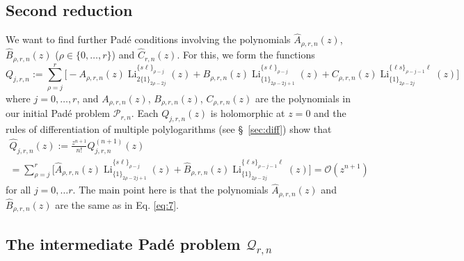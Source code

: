 \documentclass[reqno,12pt]{amsart}
\numberwithin{equation}{section}
\theoremstyle{remark}
\def\li{\operatorname{Li}}
\begin{document}
\subsection{Second reduction} \label{subsecsecondred}



We want to find further Pad\'e conditions involving the polynomials $\widehat{A}_{\rho,r,n}(z)$,  
$\widehat{B}_{\rho,r,n}(z)$ ($\rho \in\{0, \ldots, r\}$) and $\widehat{C}_{r,n}(z)$. For this, we form the functions
$$
Q_{j,r,n}:=\sum_{\rho=j}^r \bigg[-A_{\rho,r,n}(z) \li_{2\{1\}_{2\rho-2j}}^{\{s\ell\}_{\rho-j}}(z) 
+ B_{\rho,r,n}(z) \li_{\{1\}_{2\rho-2j+1}}^{\{s\ell\}_{\rho-j}}(z) + 
C_{\rho,r,n}(z) \li_{\{1\}_{2\rho-2j}}^{\{\ell s\}_{\rho-j-1}\ell}(z)\bigg]
$$
where $j=0, \ldots, r$, and  $A_{\rho,r,n}(z)$, $B_{\rho,r,n}(z)$, $C_{\rho,r,n}(z)$ are 
the polynomials in our initial Pad\'e problem $\mathcal{P}_{r,n}$. Each 
$Q_{j,r,n}(z)$ is holomorphic at $z=0$ and the rules of differentiation of multiple 
 polylogarithms (see \S~\ref{sec:diff})  
 show that
\begin{multline*}
\widehat{Q}_{j,r,n}(z):=\frac{z^{n+1}}{n!}Q_{j,r,n}^{(n+1)}(z)
\\
=\sum_{\rho=j}^r \bigg[\widehat{A}_{\rho,r,n}(z) \li_{\{1\}_{2\rho-2j+1}}^{\{s\ell\}_{\rho-j}}(z) 
+ \widehat{B}_{\rho,r,n}(z) \li_{\{1\}_{2\rho-2j}}^{\{\ell s\}_{\rho-j-1}\ell}(z) \bigg] =  \mathcal{O}(z^{n+1})
\end{multline*}
for all $j=0, \ldots r$. The main point here is that the polynomials $\widehat{A}_{\rho,r,n}(z) $ 
and $ \widehat{B}_{\rho,r,n}(z)$ are the same as 
in Eq. \eqref{eq:7}.


\subsection{The intermediate Pad\'e problem $\mathcal{Q}_{r,n}$}\label{sec:sorokinpi2}
\end{document}
